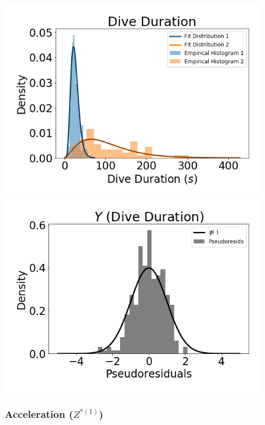 \documentclass[12pt]{TD-CJS}
\begin{document}
\includegraphics[width=4.5in]{../Plots/CarHHMM2_empirical_hist_dive_duration.png}
\includegraphics[width=4.5in]{../Plots/CarHHMM2_psedoresids_Dive_Duration.png}

\newpage
\subsubsection{Acceleration ($Z^{*(1)}$)}
\end{document}
